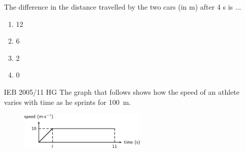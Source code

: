 \begin{enumerate}[noitemsep, label=\textbf{\arabic*}. ]
The difference in the distance travelled by the two cars (in m) after 4 s is \begin{math}...\end{math}\label{m38796*id81753}\begin{enumerate}[noitemsep, label=\textbf{\alph*}. ] 
            \label{m38796*uid188}\item 12
\label{m38796*uid189}\item 6
\label{m38796*uid190}\item 2
\label{m38796*uid191}\item 0
\end{enumerate}
                \label{m38796*uid192}\item [IEB 2005/11 HG] The graph that follows shows how the speed of an athlete varies with time as he sprints for 100~m.

    \setcounter{subfigure}{0}


	\begin{figure}[H] %
    \begin{center}
    \label{m38796*id81821!!!underscore!!!media}\label{m38796*id81821!!!underscore!!!printimage}\includegraphics[width=6cm]{col11305.imgs/m38796_PG10C2_052.png} %
        
      \vspace{2pt}
    \vspace{.1in}
    
    \end{center}

 \end{figure}   

    \addtocounter{footnote}{-0}
    

\end{enumerate}
